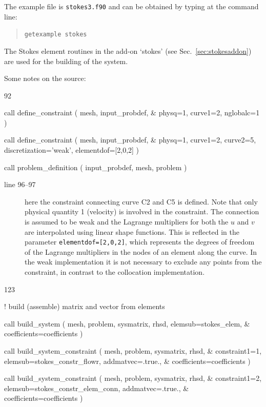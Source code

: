 The example file is \texttt{stokes3.f90} and can be obtained by typing at the
command line:
\begin{quote}
   \texttt{getexample stokes}
\end{quote}
                                                                                
The Stokes element routines
in the add-on `stokes' (see Sec.~\ref{sec:stokesaddon}) are used for
the building of the system. 

Some notes on the source:
\begin{listing}{92}

  call define_constraint ( mesh, input_probdef, &
    physq=1, curve1=2, nglobalc=1 )
                                                                                
  call define_constraint ( mesh, input_probdef, &
    physq=1, curve1=2, curve2=5, discretization='weak', elementdof=[2,0,2] )
                                                                                
  call problem_definition ( input_probdef, mesh, problem )
                                                                                
\end{listing}
\begin{description}
   \item[line 96--97] here the constraint connecting curve C2 and C5 
     is defined. Note that only physical quantity 1 (velocity) is involved
     in the constraint. The connection is assumed to be weak and the Lagrange
     multipliers for both the $u$ and $v$ are interpolated using linear shape
     functions. This is reflected in the parameter
     \texttt{elementdof=[2,0,2]}, which represents the degrees of freedom of
     the Lagrange multipliers in the nodes of an element along the curve.
     In the weak implementation it is not necessary to exclude any points
     from the constraint, in contrast to the collocation implementation.
\end{description}
\begin{listing}{123}

! build (assemble) matrix and vector from elements

  call build_system ( mesh, problem, sysmatrix, rhsd, elemsub=stokes_elem, &
    coefficients=coefficients )

  call build_system_constraint ( mesh, problem, sysmatrix, rhsd, &
    constraint1=1, elemsub=stokes_constr_flowr, addmatvec=.true., &
     coefficients=coefficients )

  call build_system_constraint ( mesh, problem, sysmatrix, rhsd, &
    constraint1=2, elemsub=stokes_constr_elem_conn, addmatvec=.true., &
     coefficients=coefficients )

\end{listing}
